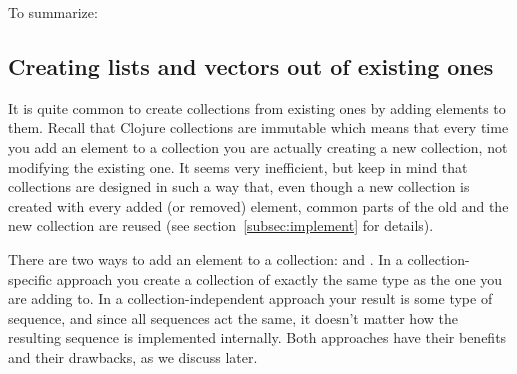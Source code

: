 To summarize: 

\subsection{Creating lists and vectors out of existing ones}\label{subsec:conj-lists-vectors}
It is quite common to create collections from existing ones by adding elements to them. Recall that Clojure collections are immutable which means that every time you add an element to a collection  you are actually creating a new collection, not modifying the existing one. %
It seems very inefficient, but keep in mind that collections are designed in such a way that, even though a new collection is created with every added (or removed) element, common parts of the old and the new collection are reused (see section~\ref{subsec:implement} for details).  

There are two ways to add an element to a collection:  and . In a collection-specific approach you create a collection of exactly the same type as the one you are adding to. In a collection-independent approach your result is some type of  sequence, and since all sequences act the same, it doesn't matter how the resulting sequence is implemented internally.  Both approaches have their benefits and their drawbacks, as we discuss later. 

